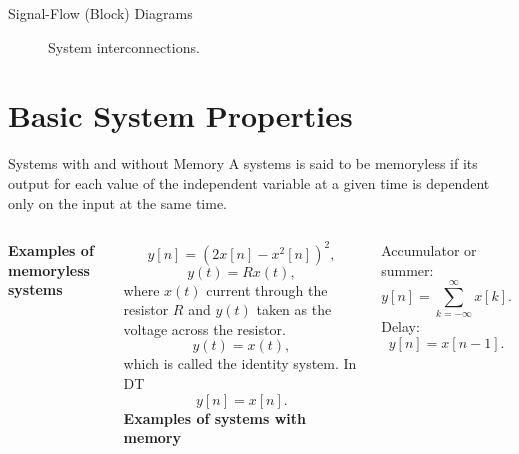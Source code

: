 \begin{frame}[plain]{Signal-Flow (Block) Diagrams}
    \begin{figure}
        \centering
        
        \caption{System interconnections.}\label{fi:sys_interconnections}
    \end{figure}
\end{frame}

\section{Basic System Properties}

\begin{frame}{Systems with and without Memory}
    A systems is said to be \alert{memoryless}  if its output for each value of the independent variable at a given time is dependent only on the input at the same time.
    \vspace{0.1in}
    \par
    \begin{columns}
            \textbf{Examples of memoryless systems}\par
            \begin{equation*}
                y[n] = (2x[n] - x^2[n])^2,
            \end{equation*}
            \begin{equation*}
                y(t) = Rx(t),
            \end{equation*}
            where $x(t)$ current through the resistor $R$ and $y(t)$ taken as the voltage across the resistor.
            \begin{equation*}
                y(t) = x(t),
            \end{equation*}
            which is called the \alert{identity system}. In DT
            \begin{equation*}
                y[n] = x[n].
            \end{equation*}
            \textbf{Examples of systems with memory}\par
            Accumulator or summer:
            \begin{equation*}
                y[n] = \sum_{k=-\infty}^{\infty}x[k].
            \end{equation*}
            Delay:
            \begin{equation*}
                y[n] = x[n-1].
            \end{equation*}

\end{columns}
\end{frame}
